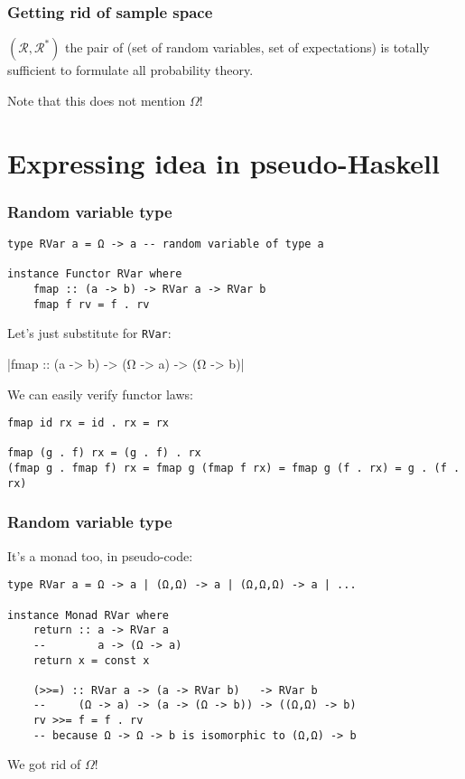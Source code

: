 \documentclass[mathserif, 8pt]{beamer}
\begin{document}
\begin{frame}
  \frametitle{Getting rid of sample space}

  $(\mathcal R, \mathcal R^*)$ the pair of (set of random variables, set of
  expectations) is totally sufficient to formulate all probability theory.

  Note that this does not mention $\Omega$!

\end{frame}

\section{Expressing idea in pseudo-Haskell}

\begin{frame}[fragile]
  \frametitle{Random variable type}

\begin{verbatim}
type RVar a = Ω -> a -- random variable of type a

instance Functor RVar where
    fmap :: (a -> b) -> RVar a -> RVar b
    fmap f rv = f . rv
\end{verbatim}

  Let's just substitute for \verb|RVar|:

  |fmap :: (a -> b) -> (Ω -> a) -> (Ω -> b)|

  We can easily verify functor laws:

\begin{verbatim}
fmap id rx = id . rx = rx

fmap (g . f) rx = (g . f) . rx
(fmap g . fmap f) rx = fmap g (fmap f rx) = fmap g (f . rx) = g . (f . rx)
\end{verbatim}
\end{frame}

\begin{frame}[fragile]
  \frametitle{Random variable type}
  It's a monad too, in pseudo-code:

\begin{verbatim}
type RVar a = Ω -> a | (Ω,Ω) -> a | (Ω,Ω,Ω) -> a | ...

instance Monad RVar where
    return :: a -> RVar a
    --        a -> (Ω -> a)
    return x = const x

    (>>=) :: RVar a -> (a -> RVar b)   -> RVar b
    --     (Ω -> a) -> (a -> (Ω -> b)) -> ((Ω,Ω) -> b)
    rv >>= f = f . rv
    -- because Ω -> Ω -> b is isomorphic to (Ω,Ω) -> b
\end{verbatim}

\alert{We got rid of $\Omega$!}

\end{frame}
\end{document}
